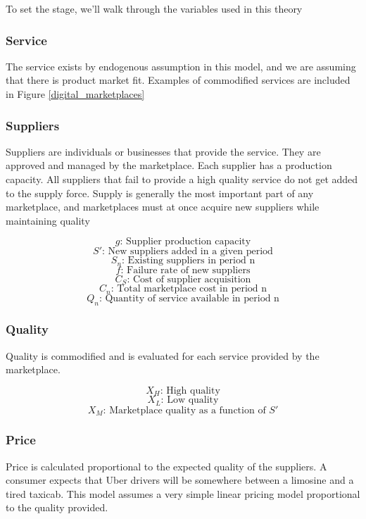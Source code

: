 To set the stage, we'll walk through the variables used in this theory

\subsubsection{Service}

The service exists by endogenous assumption in this model, and we are assuming that there is product market fit. Examples of commodified services are included in Figure \ref{digital_marketplaces} 

\subsubsection{Suppliers}

Suppliers are individuals or businesses that provide the service. They are approved and managed by the marketplace. Each supplier has a production capacity. All suppliers that fail to provide a high quality service do not get added to the supply force. Supply is generally the most important part of any marketplace, and marketplaces must at once acquire new suppliers while maintaining quality

\[g \textrm{: Supplier production capacity}\]
\[S' \textrm{: New suppliers added in a given period}\]
\[S_n \textrm{: Existing suppliers in period n}\]
\[f \textrm{: Failure rate of new suppliers}\]
\[C_S \textrm{: Cost of supplier acquisition}\]
\[C_n \textrm{: Total marketplace cost in period n}\]
\[Q_n \textrm{: Quantity of service available in period n}\]

\subsubsection{Quality}

Quality is commodified and is evaluated for each service provided by the marketplace.

\[X_H \textrm{: High quality}\]
\[X_L \textrm{: Low quality}\]
\[X_M \textrm{: Marketplace quality as a function of } S'\]

\subsubsection{Price}

Price is calculated proportional to the expected quality of the suppliers. A consumer expects that Uber drivers will be somewhere between a limosine and a tired taxicab.
This model assumes a very simple linear pricing model proportional to the quality provided.

